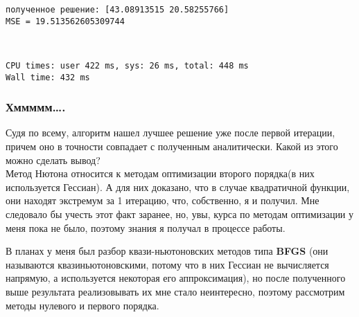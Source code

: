 \documentclass[11pt]{article}
\begin{document}
    \begin{Verbatim}[commandchars=\\\{\}]
полученное решение: [43.08913515 20.58255766]
MSE = 19.513562605309744
    \end{Verbatim}

    \begin{center}
    \end{center}
    { \hspace*{\fill} \\}
    
    \begin{Verbatim}[commandchars=\\\{\}]
CPU times: user 422 ms, sys: 26 ms, total: 448 ms
Wall time: 432 ms
    \end{Verbatim}

    \hypertarget{ux445ux43cux43cux43cux43cux43c.}{%
\subsubsection{Хммммм\ldots.}\label{ux445ux43cux43cux43cux43cux43c.}}

Судя по всему, алгоритм нашел лучшее решение уже после первой итерации,
причем оно в точности совпадает с полученным аналитически. Какой из
этого можно сделать вывод?\\
Метод Нютона относится к методам оптимизации второго порядка(в них
используется Гессиан). А для них доказано, что в случае квадратичной
функции, они находят экстремум за 1 итерацию, что, собственно, я и
получил. Мне следовало бы учесть этот факт заранее, но, увы, курса по
методам оптимизации у меня пока не было, поэтому знания я получал в
процессе работы.

В планах у меня был разбор квази-ньютоновских методов типа \textbf{BFGS}
(они называются квазиньютоновскими, потому что в них Гессиан не
вычисляется напрямую, а используется некоторая его аппроксимация), но
после полученного выше результата реализовывать их мне стало
неинтересно, поэтому рассмотрим методы нулевого и первого порядка.
\end{document}
